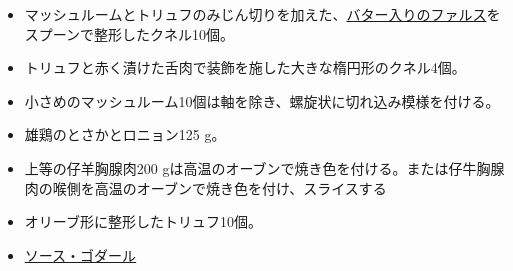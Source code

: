 \begin{recette}
\begin{itemize}
\item
  マッシュルームとトリュフのみじん切りを加えた、\protect\hyperlink{farce-a}{バター入りのファルス}をスプーンで整形したクネル10個。
\item
  トリュフと赤く漬けた舌肉で装飾を施した大きな楕円形のクネル4個。
\item
  小さめのマッシュルーム10個は軸を除き、螺旋状に切れ込み模様を付ける。
\item
  雄鶏のとさかとロニョン125 g。
\item
  上等の仔羊胸腺肉200
  gは高温のオーブンで焼き色を付ける。または仔牛胸腺肉の喉側を高温のオーブンで焼き色を付け、スライスする
\item
  オリーブ形に整形したトリュフ10個。
\item
  \protect\hyperlink{sauce-godard}{ソース・ゴダール}
\end{itemize}
\end{recette}